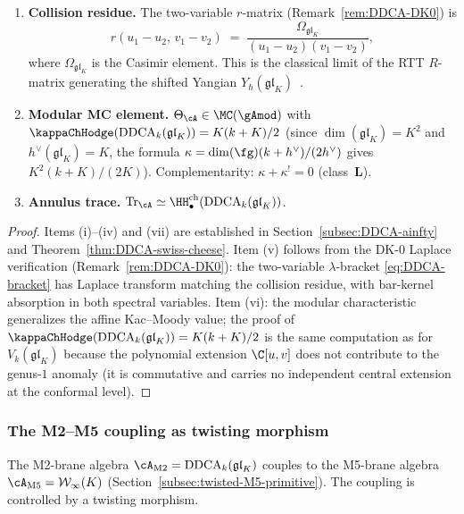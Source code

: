 \begin{theorem}
\begin{enumerate}[label=\textup{(\roman*)},nosep]
\item \textbf{Collision residue.}
 The two-variable $r$-matrix
 (Remark~\ref{rem:DDCA-DK0}) is
 \begin{equation}\label{eq:M2-r-matrix}
 r(u_1-u_2,\, v_1-v_2)
 \;=\;
 \frac{\Omega_{\mathfrak{gl}_K}}{(u_1-u_2)(v_1-v_2)},
 \end{equation}
 where $\Omega_{\mathfrak{gl}_K}$ is the Casimir element.
 This is the classical limit of the RTT $R$-matrix
 generating the shifted Yangian
 $Y_\hbar(\mathfrak{gl}_K)$~\cite{DNP2025,Guay2007}.

\item \textbf{Modular MC element.}
 $\Theta_\cA \in \MC(\gAmod)$ with
 $\kappaChHodge(\mathrm{DDCA}_k(\mathfrak{gl}_K)) = K(k + K)/2$
 \textup{(}since $\dim(\mathfrak{gl}_K) = K^2$ and
 $h^\vee(\mathfrak{gl}_K) = K$, the formula
 $\kappa = \dim(\fg)(k+h^\vee)/(2h^\vee)$ gives
 $K^2(k+K)/(2K)$\textup{)}. Complementarity:
 $\kappa + \kappa^! = 0$ \textup{(}class~$\mathbf{L}$\textup{)}.

\item \textbf{Annulus trace.}
 $\operatorname{Tr}_\cA \simeq
 \HH^{\mathrm{ch}}_\bullet(\mathrm{DDCA}_k(\mathfrak{gl}_K))$.
\end{enumerate}
\end{theorem}

\begin{proof}
Items (i)--(iv) and (vii) are established in
Section~\ref{subsec:DDCA-ainfty} and
Theorem~\ref{thm:DDCA-swiss-cheese}.
Item (v) follows from the DK-0 Laplace verification
(Remark~\ref{rem:DDCA-DK0}): the two-variable $\lambda$-bracket
\eqref{eq:DDCA-bracket} has Laplace transform matching the
collision residue, with bar-kernel absorption in both spectral
variables.
Item (vi): the modular characteristic generalizes the affine
Kac--Moody value; the proof of
$\kappaChHodge(\mathrm{DDCA}_k(\mathfrak{gl}_K)) = K(k + K)/2$ is the
same computation as for $V_k(\mathfrak{gl}_K)$ because the
polynomial extension $\C[u,v]$ does not contribute to the
genus-$1$ anomaly (it is commutative and carries no independent
central extension at the conformal level).
\end{proof}

\subsubsection{The M2--M5 coupling as twisting morphism}

The M2-brane algebra $\cA_{\mathrm{M2}} = \mathrm{DDCA}_k(\mathfrak{gl}_K)$
couples to the M5-brane algebra
$\cA_{\mathrm{M5}} = \mathcal{W}_\infty(K)$
(Section~\ref{subsec:twisted-M5-primitive}).
The coupling is controlled by a twisting morphism.

